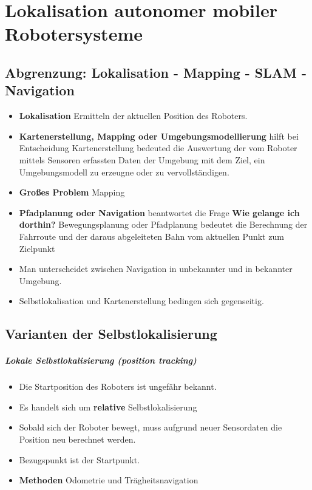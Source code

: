 \chapter{Lokalisation autonomer mobiler Robotersysteme}
\section{Abgrenzung: Lokalisation - Mapping - SLAM - Navigation}
\begin{itemize}
	\item \textbf{Lokalisation} Ermitteln der aktuellen Position des Roboters.
	\item \textbf{Kartenerstellung, Mapping oder Umgebungsmodellierung} hilft bei Entscheidung
	\subitem Kartenerstellung bedeuted die Auswertung der vom Roboter mittels Sensoren erfassten Daten der Umgebung mit dem Ziel, ein Umgebungsmodell zu erzeugne oder zu vervollständigen.
	\item \textbf{Großes Problem} Mapping
	\item \textbf{Pfadplanung oder Navigation} beantwortet die Frage \textbf{Wie gelange ich dorthin?} Bewegungsplanung oder Pfadplanung bedeutet die Berechnung der Fahrroute und der daraus abgeleiteten Bahn vom aktuellen Punkt zum Zielpunkt
	\item Man unterscheidet zwischen Navigation in unbekannter und in bekannter Umgebung.
	\item Selbstlokalisation und Kartenerstellung bedingen sich gegenseitig.
\end{itemize}
\section{Varianten der Selbstlokalisierung}
\paragraph{Lokale Selbstlokalisierung (position tracking)}
\begin{itemize}
	\item Die Startposition des Roboters ist ungefähr bekannt.
	\item Es handelt sich um \textbf{relative} Selbstlokalisierung
	\item Sobald sich der Roboter bewegt, muss aufgrund neuer Sensordaten die Position neu berechnet werden.
	\item Bezugspunkt ist der Startpunkt.
	\item \textbf{Methoden} Odometrie und Trägheitsnavigation
\end{itemize}
